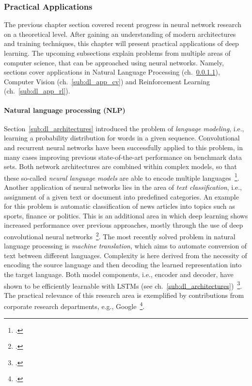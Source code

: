 \subsubsection{Practical Applications}
\label{sub:dl_applications}

The previous chapter section covered recent progress in neural network research
on a theoretical level.
After gaining an understanding of modern architectures and training techniques,
this chapter will present practical applications of deep learning.
The upcoming subsections explain problems from multiple areas of computer
science, that can be approached using neural networks.
Namely, sections cover applications in Natural Language Processing (ch.~\ref{sub:dl_app_nlp}),
Computer Vision (ch.~\ref{sub:dl_app_cv}) and Reinforcement Learning (ch.~\ref{sub:dl_app_rl}).

\paragraph{Natural language processing (NLP)}
\label{sub:dl_app_nlp}

Section~\ref{sub:dl_architectures} introduced the problem of \textit{language modeling},
i.e., learning a probability distribution for words in a given sequence.
Convolutional and recurrent neural networks have been successfully applied to
this problem, in many cases improving previous state-of-the-art performance
on benchmark data sets.
Both network architectures are combined within complex models, so that these
so-called \textit{neural language models} are able to encode multiple
languages~\footcite{Kim2015}.
Another application of neural networks lies in the area of \textit{text classification},
i.e., assignment of a given text or document into predefined categories.
An example for this problem is automatic classification of news articles into topics such
as sports, finance or politics.
This is an additional area in which deep learning shows increased performance
over previous approaches, mostly through the use of deep convolutional neural
networks~\footcite{Conneau2016}.
The most recently solved problem in natural language processing is \textit{machine
translation}, which aims to automate conversion of text between different
languages.
Complexity is here derived from the necessity of encoding the source language and
then decoding the learned representation into the target language.
Both model components, i.e., encoder and decoder, have shown to be efficiently
learnable with LSTMs (see ch.~\ref{sub:dl_architectures})~\footcite{Sutskever2014}.
The practical relevance of this research area is exemplified by contributions
from corporate research departments, e.g., Google~\footcite{Wu2016}.

